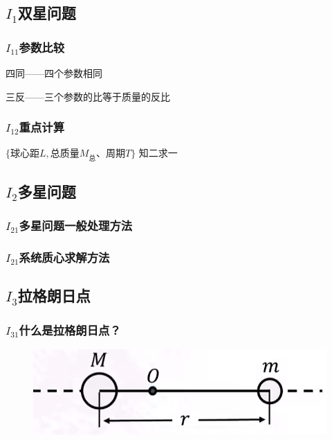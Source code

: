 \documentclass[lang=cn,10pt]{elegantbook}
\begin{document}
	       \subsection{$I_1$双星问题}
	       \subsubsection{$I_{11}$参数比较}
	       四同——四个参数相同
	       \vspace{2cm}
	       
	       三反——三个参数的比等于质量的反比
	       \vspace{2cm}
	       \subsubsection{$I_{12}$重点计算 }
	        $\{\text{球心距}L,\text{总质量}M_\text{总}{\text{、周期}T}\}\text{ 知二求一}$
	        \vspace{2cm}
	        
	        \subsection{$I_2$多星问题}
	        \subsubsection{$I_{21}$多星问题一般处理方法}
	        \vspace{3cm}
	        
	        \subsubsection{$I_{21}$系统质心求解方法}
	        \vspace{3cm}
	        
	        \subsection{$I_3$拉格朗日点}
	        \subsubsection{$I_{31}$什么是拉格朗日点？}
	        \begin{figure}[H]
	        	\centering
	        	\includegraphics[width=0.3\linewidth]{image/55}
	        \end{figure}
	        
\end{document}
